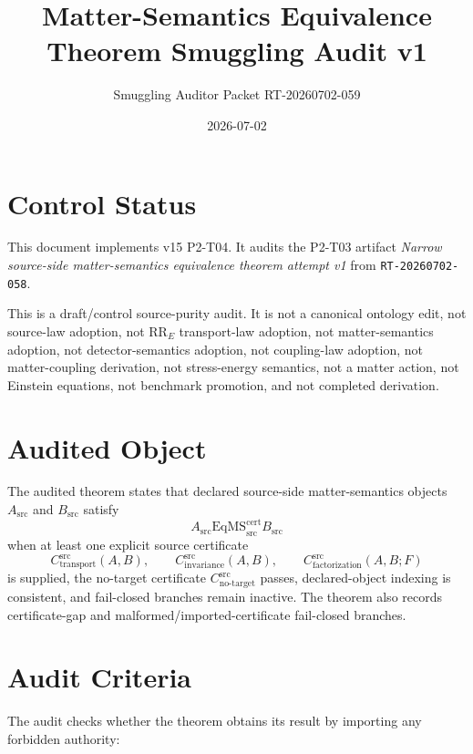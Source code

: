 \documentclass[11pt]{article}
\title{Matter-Semantics Equivalence Theorem Smuggling Audit v1}
\author{Smuggling Auditor Packet RT-20260702-059}
\date{2026-07-02}
\newcommand{\EqMS}{\mathrm{EqMS}_{\mathrm{src}}^{\mathrm{cert}}}
\newcommand{\CTr}{C_{\mathrm{transport}}^{\mathrm{src}}}
\newcommand{\CInv}{C_{\mathrm{invariance}}^{\mathrm{src}}}
\newcommand{\CFact}{C_{\mathrm{factorization}}^{\mathrm{src}}}
\newcommand{\CNTI}{C_{\mathrm{no\text{-}target}}^{\mathrm{src}}}
\begin{document}
\maketitle

\section{Control Status}

This document implements v15 P2-T04. It audits the P2-T03 artifact
\emph{Narrow source-side matter-semantics equivalence theorem attempt v1}
from \texttt{RT-20260702-058}.

This is a draft/control source-purity audit. It is not a canonical ontology
edit, not source-law adoption, not \(\mathrm{RR}_{E}\) transport-law
adoption, not matter-semantics adoption, not detector-semantics adoption, not
coupling-law adoption, not matter-coupling derivation, not stress-energy
semantics, not a matter action, not Einstein equations, not benchmark
promotion, and not completed derivation.

\section{Audited Object}

The audited theorem states that declared source-side matter-semantics objects
\(A_{\mathrm{src}}\) and \(B_{\mathrm{src}}\) satisfy
\[
  A_{\mathrm{src}} \EqMS B_{\mathrm{src}}
\]
when at least one explicit source certificate
\[
  \CTr(A,B),\qquad \CInv(A,B),\qquad \CFact(A,B;F)
\]
is supplied, the no-target certificate \(\CNTI\) passes, declared-object
indexing is consistent, and fail-closed branches remain inactive. The theorem
also records certificate-gap and malformed/imported-certificate fail-closed
branches.

\section{Audit Criteria}

The audit checks whether the theorem obtains its result by importing any
forbidden authority:
\end{document}
